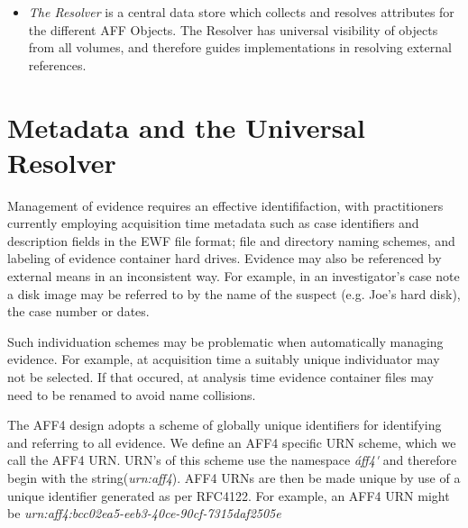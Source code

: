 \documentclass[10pt, conference]{IEEEtran}
\begin{document}
\begin{itemize}
\item \emph{The Resolver} is a central data store which collects and resolves
  attributes for the different AFF Objects. The Resolver has universal
  visibility of objects from all volumes, and therefore guides
  implementations in resolving external references.
\end{itemize}

\section{Metadata and the Universal Resolver}
\label{resolver}

Management of evidence requires an effective identififaction, with
practitioners currently employing acquisition time metadata such as
case identifiers and description fields in the EWF file format; file
and directory naming schemes, and labeling of evidence container hard
drives. Evidence may also be referenced by external means in an
inconsistent way. For example, in an investigator's case note a disk
image may be referred to by the name of the suspect (e.g. Joe's hard
disk), the case number or dates.

Such individuation schemes may be problematic when automatically
managing evidence. For example, at acquisition time a suitably unique
individuator may not be selected. If that occured, at analysis time
evidence container files may need to be renamed to avoid name
collisions.

The AFF4 design adopts a scheme of globally unique identifiers for
identifying and referring to all evidence. We define an AFF4 specific
URN scheme, which we call the AFF4 URN. URN's of this scheme use the
namespace\cite{RFC1737} \emph{\'aff4\'} and therefore begin with the 
string(\emph{urn:aff4}). AFF4 URNs are then be made unique by use of 
a unique identifier generated
as per RFC4122\cite{RFC4122}. For example, an AFF4 URN might be
\emph{urn:aff4:bcc02ea5-eeb3-40ce-90cf-7315daf2505e}

\end{document}
